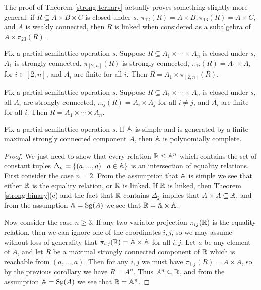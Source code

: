 \documentclass[letterpaper,11pt]{article}
\DeclareMathOperator{\Sg}{Sg}
\begin{document}
\begin{rem} The proof of Theorem \ref{strong-ternary} actually proves something slightly more general: if $R \subseteq A\times B \times C$ is closed under $s$, $\pi_{12}(R) = A\times B, \pi_{13}(R) = A\times C$, and $A$ is weakly connected, then $R$ is linked when considered as a subalgebra of $A \times \pi_{23}(R)$.
\end{rem}

\begin{cor} Fix a partial semilattice operation $s$. Suppose $R \subseteq A_1 \times \cdots \times A_n$ is closed under $s$, $A_1$ is strongly connected, $\pi_{[2,n]}(R)$ is strongly connected, $\pi_{1i}(R) = A_1 \times A_i$ for $i \in [2,n]$, and $A_i$ are finite for all $i$. Then $R = A_1 \times \pi_{[2,n]}(R)$.
\end{cor}

\begin{cor}\label{strong-product} Fix a partial semilattice operation $s$. Suppose $R \subseteq A_1 \times \cdots \times A_n$ is closed under $s$, all $A_i$ are strongly connected, $\pi_{ij}(R) = A_i \times A_j$ for all $i \ne j$, and $A_i$ are finite for all $i$. Then $R = A_1 \times \cdots \times A_n$.
\end{cor}

\begin{cor}\label{simple-strong-poly} Fix a partial semilattice operation $s$. If $\mathbb{A}$ is simple and is generated by a finite maximal strongly connected component $A$, then $\mathbb{A}$ is polynomially complete.
\end{cor}
\begin{proof} We just need to show that every relation $\mathbb{R} \le \mathbb{A}^n$ which contains the set of constant tuples $\Delta_n = \{(a, ..., a) \mid a \in \mathbb{A}\}$ is an intersection of equality relations. First consider the case $n = 2$. From the assumption that $\mathbb{A}$ is simple we see that either $\mathbb{R}$ is the equality relation, or $\mathbb{R}$ is linked. If $\mathbb{R}$ is linked, then Theorem \ref{strong-binary}(c) and the fact that $\mathbb{R}$ contains $\Delta_2$ implies that $A \times A \subseteq \mathbb{R}$, and from the assumption $\bA = \Sg(A)$ we see that $\mathbb{R} = \mathbb{A} \times \mathbb{A}$.

Now consider the case $n \ge 3$. If any two-variable projection $\pi_{ij}(\mathbb{R})$ is the equality relation, then we can ignore one of the coordinates $i,j$, so we may assume without loss of generality that $\pi_{i,j}(\mathbb{R}) = \mathbb{A}\times \mathbb{A}$ for all $i,j$. Let $a$ be any element of $A$, and let $R$ be a maximal strongly connected component of $\mathbb{R}$ which is reachable from $(a, ..., a)$. Then for any $i,j$ we must have $\pi_{i,j}(R) = A\times A$, so by the previous corollary we have $R = A^n$. Thus $A^n \subseteq \mathbb{R}$, and from the assumption $\bA = \Sg(A)$ we see that $\mathbb{R} = \mathbb{A}^n$.
\end{proof}
\end{document}
